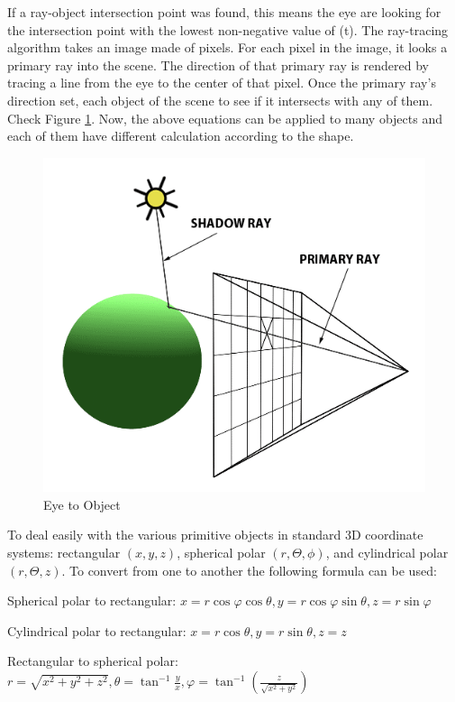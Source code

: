 \documentclass[a4paper, 12pt]{article}
\begin{document}
If a ray-object intersection point was found, this means the eye are looking for the intersection point with the lowest non-negative value of (t). The ray-tracing algorithm takes an image made of pixels. For each pixel in the image, it looks a primary ray into the scene. The direction of that primary ray is rendered by tracing a line from the eye to the center of that pixel. Once the primary ray's direction set, each object of the scene to see if it intersects with any of them. Check Figure \ref{fig:EyetoObject}. Now, the above equations can be applied to many objects and each of them have different calculation according to the shape.

\begin{figure}[h] 
\centering
\includegraphics[scale=0.3]{ShD_light_source.png}
  \caption{Eye to Object}
   \label{fig:EyetoObject}
\end{figure}

To deal easily with the various primitive objects in standard 3D coordinate systems: rectangular $(x,y,z)$, spherical polar $(r, \Theta, \phi)$, and cylindrical polar $(r, \Theta, z)$. To convert from one to another the following formula can be used:

Spherical polar to rectangular: $x=r\cos{\varphi}\cos{\theta}, y=r\cos{\varphi}\sin{\theta}, z=r\sin{\varphi}$

Cylindrical polar to rectangular: $x=r\cos{\theta}, y=r\sin{\theta}, z=z$


Rectangular to spherical polar: $r=\sqrt{x^2+y^2+z^2}, \theta=\tan^{-1}{\frac{y}{x}}, \varphi=\tan^{-1}{(\frac{z}{\sqrt{x^2+y^2}})}$
\end{document}
